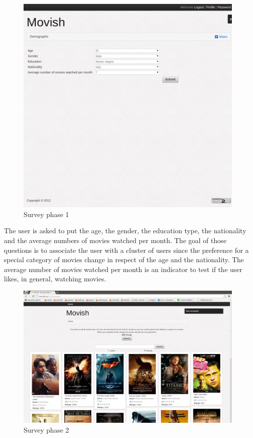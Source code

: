 \begin{figure}
  \centering
  \includegraphics[width=\textwidth]{figures/survey_demographic.png}
  \caption{Survey phase 1}
  \label{fig:survey_phase_1}
\end{figure}

The user is asked to put the age, the gender, the education type, the nationality and the average numbers of movies watched per month. The goal of those questions is to associate the user with a cluster of users since the preference for a special category of movies change in respect of the age and the nationality. The average number of movies watched per month is an indicator to test if the user likes, in general, watching movies.

\begin{figure}
  \centering
  \includegraphics[width=\textwidth]{figures/free_ratings.png}
  \caption{Survey phase 2}
  \label{fig:survey_phase_2}
\end{figure}

